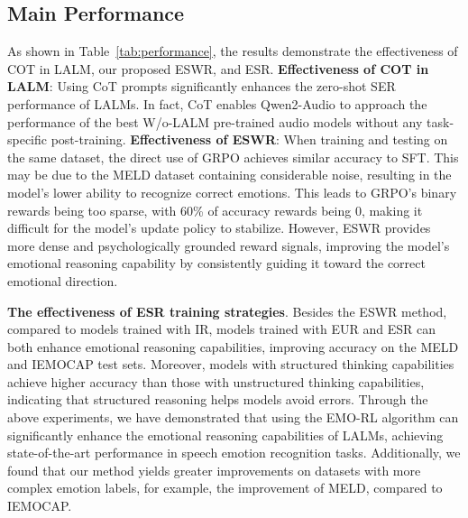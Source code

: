 \documentclass[11pt]{article}
\begin{document}
\subsection{Main Performance}
As shown in Table~\ref{tab:performance}, the results demonstrate the effectiveness of COT in LALM, our proposed ESWR, and ESR.
\textbf{Effectiveness of COT in LALM}: Using CoT prompts significantly enhances the zero-shot SER performance of LALMs. In fact, CoT enables Qwen2-Audio to approach the performance of the best W/o-LALM pre-trained audio models without any task-specific post-training.
\textbf{Effectiveness of ESWR}: When training and testing on the same dataset, the direct use of GRPO achieves similar accuracy to SFT. This may be due to the MELD dataset containing considerable noise, resulting in the model's lower ability to recognize correct emotions. This leads to GRPO's binary rewards being too sparse, with 60\% of accuracy rewards being 0, making it difficult for the model's update policy to stabilize. However, ESWR provides more dense and psychologically grounded reward signals, improving the model's emotional reasoning capability by consistently guiding it toward the correct emotional direction.

\textbf{The effectiveness of ESR training strategies}. Besides the ESWR method, compared to models trained with IR, models trained with EUR and ESR can both enhance emotional reasoning capabilities, improving accuracy on the MELD and IEMOCAP test sets. Moreover, models with structured thinking capabilities achieve higher accuracy than those with unstructured thinking capabilities, indicating that structured reasoning helps models avoid errors.
Through the above experiments, we have demonstrated that using the EMO-RL algorithm can significantly enhance the emotional reasoning capabilities of LALMs, achieving state-of-the-art performance in speech emotion recognition tasks. Additionally, we found that our method yields greater improvements on datasets with more complex emotion labels, for example, the improvement of MELD, compared to IEMOCAP.
\end{document}
